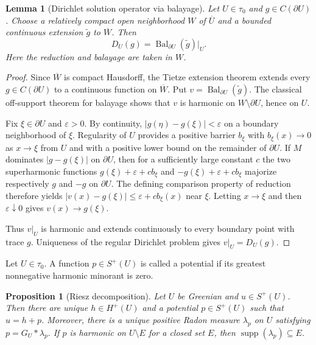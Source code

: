 \documentclass{amsart}
\newtheorem{proposition}[theorem]{Proposition}
\newtheorem{lemma}[theorem]{Lemma}
\theoremstyle{definition}
\theoremstyle{remark}
\numberwithin{equation}{section}
\begin{document}
\begin{lemma}[Dirichlet solution operator via balayage]\label{prop: HU via balayage}
	Let $U\in\tau_0$ and $g\in C(\partial U)$. Choose a relatively compact open neighborhood $W$ of $\overline U$ and a bounded continuous extension $\tilde g$ to $\overline W$. Then
	$$
	D_U(g)=\operatorname{Bal}_{\partial U}(\tilde g)|_U.
	$$
	Here the reduction and balayage are taken in $W$.
\end{lemma}

\begin{proof}
	Since $\overline W$ is compact Hausdorff, the Tietze extension theorem extends every $g\in C(\partial U)$ to a continuous function on $\overline W$. Put $v=\operatorname{Bal}_{\partial U}(\tilde g)$. The classical off-support theorem for balayage shows that $v$ is harmonic on $W\setminus\partial U$, hence on $U$.
	
	Fix $\xi\in\partial U$ and $\varepsilon>0$. By continuity, $|g(\eta)-g(\xi)|<\varepsilon$ on a boundary neighborhood of $\xi$. Regularity of $U$ provides a positive barrier $b_\xi$ with $b_\xi(x)\to0$ as $x\to\xi$ from $U$ and with a positive lower bound on the remainder of $\partial U$. If $M$ dominates $|g-g(\xi)|$ on $\partial U$, then for a sufficiently large constant $c$ the two superharmonic functions $g(\xi)+\varepsilon+cb_\xi$ and $-g(\xi)+\varepsilon+cb_\xi$ majorize respectively $g$ and $-g$ on $\partial U$. The defining comparison property of reduction therefore yields $|v(x)-g(\xi)|\le\varepsilon+cb_\xi(x)$ near $\xi$. Letting $x\to\xi$ and then $\varepsilon\downarrow0$ gives $v(x)\to g(\xi)$.
	
	Thus $v|_U$ is harmonic and extends continuously to every boundary point with trace $g$. Uniqueness of the regular Dirichlet problem gives $v|_U=D_U(g)$.
\end{proof}



Let $U\in\tau_0$. A function $p\in S^+(U)$ is called a {potential} if its greatest nonnegative harmonic minorant is zero. %

\begin{proposition}[Riesz decomposition]
	\label{cor:riesz-decomposition}
	Let $U$ be Greenian and $u\in S^+(U)$. Then there are unique
	$h\in H^+(U)$ and a potential $p\in S^+(U)$ such that
	$u=h+p$. Moreover, there is a unique positive Radon measure
	$\lambda_p$ on $U$ satisfying
	$p = G_U *\lambda_p.$
	If $p$ is harmonic on $U\setminus E$ for a closed set $E$, then
	$\operatorname{supp}(\lambda_p)\subseteq E$.
\end{proposition}
\end{document}
